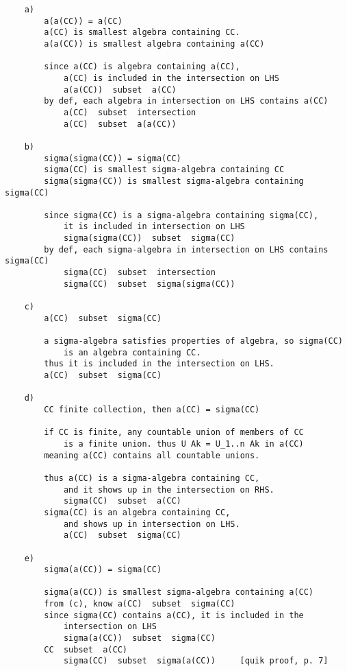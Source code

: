 \documentclass{article}
\begin{document}
\begin{flushleft}
\begin{verbatim}
    a)
        a(a(CC)) = a(CC)
        a(CC) is smallest algebra containing CC. 
        a(a(CC)) is smallest algebra containing a(CC)
        
        since a(CC) is algebra containing a(CC), 
            a(CC) is included in the intersection on LHS 
            a(a(CC))  subset  a(CC)
        by def, each algebra in intersection on LHS contains a(CC)
            a(CC)  subset  intersection 
            a(CC)  subset  a(a(CC))

    b)
        sigma(sigma(CC)) = sigma(CC)
        sigma(CC) is smallest sigma-algebra containing CC 
        sigma(sigma(CC)) is smallest sigma-algebra containing sigma(CC)
        
        since sigma(CC) is a sigma-algebra containing sigma(CC),
            it is included in intersection on LHS 
            sigma(sigma(CC))  subset  sigma(CC)
        by def, each sigma-algebra in intersection on LHS contains sigma(CC)
            sigma(CC)  subset  intersection 
            sigma(CC)  subset  sigma(sigma(CC))

    c)
        a(CC)  subset  sigma(CC)

        a sigma-algebra satisfies properties of algebra, so sigma(CC)
            is an algebra containing CC. 
        thus it is included in the intersection on LHS. 
        a(CC)  subset  sigma(CC)

    d)
        CC finite collection, then a(CC) = sigma(CC)

        if CC is finite, any countable union of members of CC 
            is a finite union. thus U Ak = U_1..n Ak in a(CC)
        meaning a(CC) contains all countable unions. 
        
        thus a(CC) is a sigma-algebra containing CC, 
            and it shows up in the intersection on RHS. 
            sigma(CC)  subset  a(CC)
        sigma(CC) is an algebra containing CC, 
            and shows up in intersection on LHS. 
            a(CC)  subset  sigma(CC)

    e)
        sigma(a(CC)) = sigma(CC)

        sigma(a(CC)) is smallest sigma-algebra containing a(CC)
        from (c), know a(CC)  subset  sigma(CC)
        since sigma(CC) contains a(CC), it is included in the 
            intersection on LHS 
            sigma(a(CC))  subset  sigma(CC)
        CC  subset  a(CC)
            sigma(CC)  subset  sigma(a(CC))     [quik proof, p. 7]


\end{verbatim}
\end{flushleft}
\end{document}

